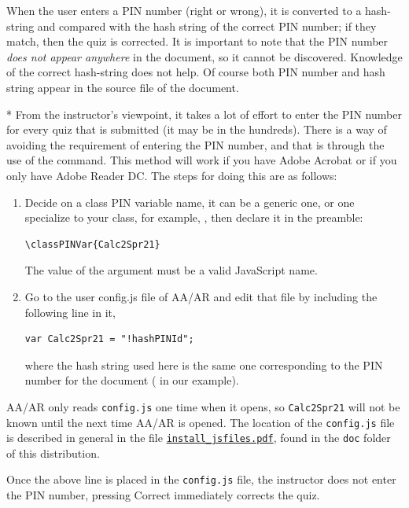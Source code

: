 \documentclass[10pt]{article}
\makeatletter
\renewcommand*{\theparagraph}{\texorpdfstring{\protect\P}{\textparagraph}}
\renewcommand{\paragraph}
    {\renewcommand{\@seccntformat}[1]{\theparagraph\space}%
    \@startsection{paragraph}{4}{0pt}{6pt}{-3pt}{\bfseries}}
\let\uif\textsf
\let\app\textsf
\edef\amtIndent{\the\parindent}
\makeatother
\begin{document}
When the user enters a PIN number (right or wrong), it is converted to a
hash-string and compared with the hash string of the correct PIN number; if
they match, then the quiz is corrected. It is important to note that the PIN
number \emph{does not appear anywhere} in the document, so it cannot be
discovered. Knowledge of the correct hash-string does not help. Of course
both PIN number and hash string appear in the source file of the document.

\paragraph*{} From the
instructor's viewpoint, it takes a lot of effort to enter the PIN number for
every quiz that is submitted (it may be in the hundreds). There is a way of
avoiding the requirement of entering the PIN number, and that is through the
use of the  command. This method will work if you have
\app{Adobe Acrobat} or if you only have \app{Adobe Reader DC}. The steps for
doing this are as follows:
\begin{enumerate}
    \item Decide on a class PIN variable name, it can be a generic one, or one specialize to your class,
    for example, , then declare it in the preamble:
\begin{Verbatim}[xleftmargin=\amtIndent]
\classPINVar{Calc2Spr21}
\end{Verbatim}
The value of the argument must be a valid JavaScript name.
    \item Go to the user config.js file of AA/AR and edit that file by
        including the following line in it,
\begin{Verbatim}[xleftmargin=\amtIndent,commandchars=!()]
var Calc2Spr21 = "!hashPINId";
\end{Verbatim}
where the hash string used here is the same one corresponding to the PIN
number for the document (\texttt{\numPINId} in our example).
\end{enumerate}
\app{AA/AR} only reads \texttt{config.js} one time when it opens, so
\texttt{Calc2Spr21} will not be known until the next time \app{AA/AR} is opened.
The location of the \texttt{config.js} file is described in general in the
file \texttt{\href{install_jsfiles.pdf}{install\_jsfiles.pdf}}, found in the \texttt{doc} folder of this
distribution.

Once the above line is placed in the \texttt{config.js} file, the instructor does not
enter the PIN number, pressing \uif{Correct} immediately corrects the quiz.
\end{document}
